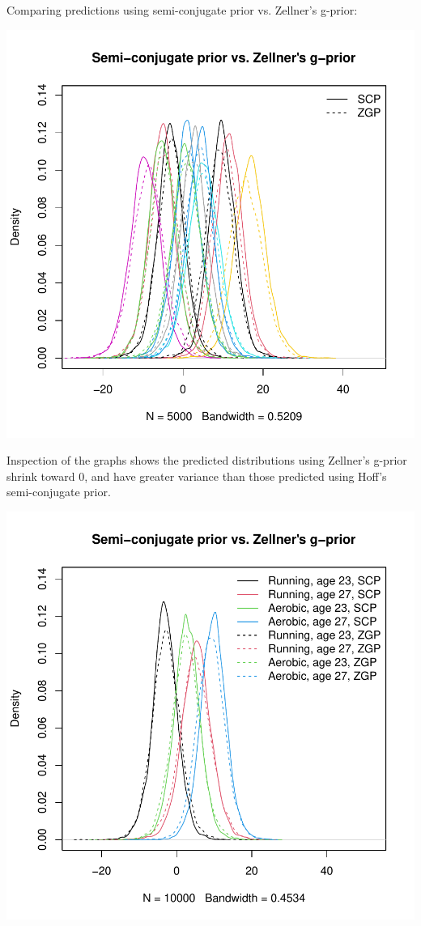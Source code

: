 \documentclass[12pt, a4paper]{article}
\begin{document}
\clearpage

Comparing predictions using semi-conjugate prior vs. Zellner's g-prior:

\includegraphics{Thesis-019}

Inspection of the graphs shows the predicted distributions using Zellner's g-prior shrink toward 0, and have greater variance than those predicted using Hoff's semi-conjugate prior.

\includegraphics{Thesis-020}
\end{document}
